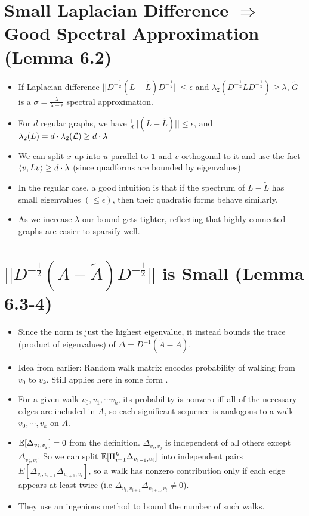 \documentclass[11pt]{article}
\begin{document}
\section{Small Laplacian Difference \(\Rightarrow\) Good Spectral Approximation (Lemma 6.2)}
\label{sec:org42a56af}
\begin{itemize}
\item If Laplacian difference \(||D^{-\frac12}(L-\tilde{L}) D^{-\frac12}|| \le \epsilon\) and \(\lambda_2(D^{-\frac12}L D^{-\frac12}) \ge \lambda\), \(\tilde{G}\) is a \(\sigma = \frac{\lambda}{\lambda-\epsilon}\) spectral approximation.
\item For \(d\) regular graphs, we have \(\frac{1}{d}||(L-\tilde{L})|| \le \epsilon\), and \(\lambda_2(L)=d \cdot \lambda_2(\mathcal{L}) \ge d \cdot \lambda\)
\item We can split \(x\) up into \(u\) parallel to \(\textbf{1}\) and \(v\) orthogonal to it and use the fact \(\langle v , Lv \rangle \ge d \cdot \lambda\) (since quadforms are bounded by eigenvalues)
\item In the regular case, a good intuition is that if the spectrum of \(L-\tilde{L}\) has small eigenvalues \((\le \epsilon)\), then their quadratic forms behave similarly.
\item As we increase \(\lambda\) our bound gets tighter, reflecting that highly-connected graphs are easier to sparsify well.
\end{itemize}
\section{\(||D^{-\frac12}(A-\tilde{A}) D^{-\frac12}||\) is Small (Lemma 6.3-4)}
\label{sec:orga81feeb}
\begin{itemize}
\item Since the norm is just the highest eigenvalue, it instead bounds the trace (product of eigenvalues) of \(\Delta= D^{-1}(\tilde{A}-A)\).
\item Idea from earlier: Random walk matrix encodes probability of walking from \(v_0\) to \(v_k\). Still applies here in some form .
\item For a given walk \(v_0,v_1,\cdots v_k\), its probability is nonzero iff all of the necessary edges are included in \(A\), so each significant sequence is analogous to a walk \(v_0, \cdots, v_k\) on \(A\).
\item \(\mathbb{E}[\Delta_{v_i,v_j}]=0\) from the definition. \(\Delta_{v_i,v_j}\) is independent of all others except \(\Delta_{v_j,v_i}\). So we can split \(\mathbb{E}[\Pi_{i=1}^k \Delta_{v_{i-1},v_i}]\) into independent pairs \(E[\Delta_{v_i,v_{i+1}}\Delta_{v_{i+1},v_i}]\), so a walk has nonzero contribution only if each edge appears at least twice (i.e \(\Delta_{v_i,v_{i+1}}\Delta_{v_{i+1},v_i} \ne 0\)).
\item They use an ingenious method to bound the number of such walks.
\end{itemize}
\end{document}
